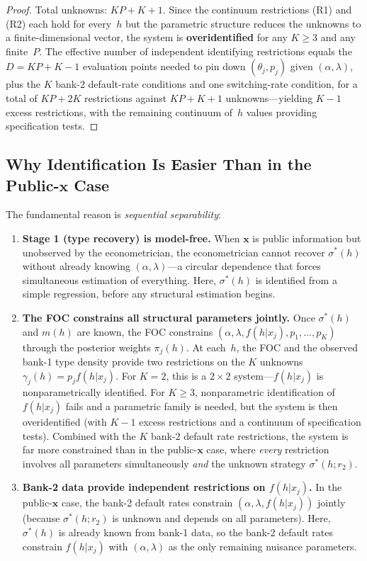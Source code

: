 \documentclass[12pt]{article}
\theoremstyle{plain}
\theoremstyle{plain}
\theoremstyle{definition}
\theoremstyle{remark}
\begin{document}
\begin{proof}
Total unknowns: $KP + K + 1$.  Since the continuum restrictions (R1) and (R2) each hold for every~$h$ but the parametric structure reduces the unknowns to a finite-dimensional vector, the system is \textbf{overidentified} for any $K \geq 3$ and any finite~$P$.  The effective number of independent identifying restrictions equals the $D = KP + K - 1$ evaluation points needed to pin down $(\theta_j, p_j)$ given $(\alpha,\lambda)$, plus the $K$ bank-2 default-rate conditions and one switching-rate condition, for a total of $KP + 2K$ restrictions against $KP + K + 1$ unknowns---yielding $K - 1$ excess restrictions, with the remaining continuum of~$h$ values providing specification tests.
\end{proof}

 


\subsection{Why Identification Is Easier Than in the Public-$\mathbf{x}$ Case}\label{sec:why_easier8}

The fundamental reason is \emph{sequential separability}:

\begin{enumerate}
    \item \textbf{Stage 1 (type recovery) is model-free.}  When $\mathbf{x}$ is public information but unobserved by the econometrician, the econometrician cannot recover $\sigma^*(h)$ without already knowing $(\alpha, \lambda)$---a circular dependence that forces simultaneous estimation of everything.  Here, $\sigma^*(h)$ is identified from a simple regression, before any structural estimation begins.

    \item \textbf{The FOC constrains all structural parameters jointly.}  Once $\sigma^*(h)$ and $m(h)$ are known, the FOC constrains $(\alpha, \lambda, f(h|x_j), p_1, \ldots, p_K)$ through the posterior weights $\pi_j(h)$.  At each~$h$, the FOC and the observed bank-1 type density provide two restrictions on the $K$ unknowns $\gamma_j(h) = p_j f(h|x_j)$.  For $K = 2$, this is a $2 \times 2$ system---$f(h|x_j)$ is nonparametrically identified.  For $K \geq 3$, nonparametric identification of $f(h|x_j)$ fails and a parametric family is needed, but the system is then overidentified (with $K - 1$ excess restrictions and a continuum of specification tests).  Combined with the $K$ bank-2 default rate restrictions, the system is far more constrained than in the public-$\mathbf{x}$ case, where \emph{every} restriction involves all parameters simultaneously \emph{and} the unknown strategy $\sigma^*(h; r_2)$.

    \item \textbf{Bank-2 data provide independent restrictions on $f(h|x_j)$.}  In the public-$\mathbf{x}$ case, the bank-2 default rates constrain $(\alpha, \lambda, f(h|x_j))$ jointly (because $\sigma^*(h; r_2)$ is unknown and depends on all parameters).  Here, $\sigma^*(h)$ is already known from bank-1 data, so the bank-2 default rates constrain $f(h|x_j)$ with $(\alpha, \lambda)$ as the only remaining nuisance parameters.
\end{enumerate}
\end{document}
